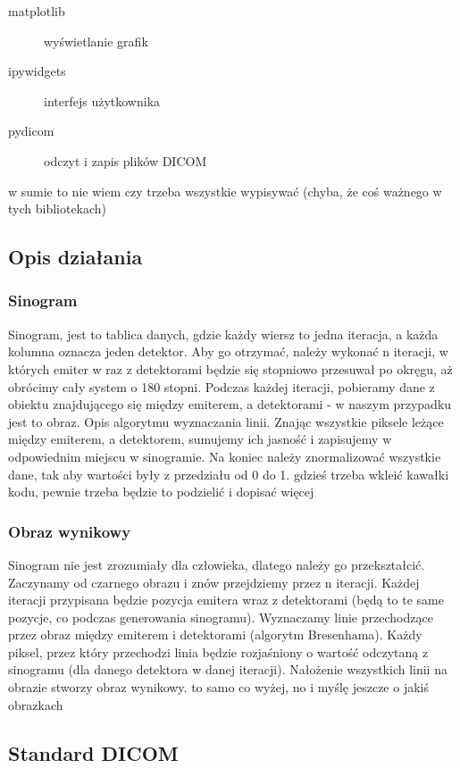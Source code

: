 \documentclass[polish,polish,a4paper]{article}
\begin{document}
			\begin{description}
				\item[matplotlib] wyświetlanie grafik
				\item[ipywidgets] interfejs użytkownika
				\item[pydicom] odczyt i zapis plików DICOM
			\end{description}
			{\color{red} w sumie to nie wiem czy trzeba wszystkie wypisywać (chyba, że coś ważnego w tych bibliotekach)}
	
			\subsection{Opis działania}
				\subsubsection{Sinogram}
				
				Sinogram, jest to tablica danych, 
				gdzie każdy wiersz to jedna iteracja, 
				a każda kolumna oznacza jeden detektor.
				Aby go otrzymać, należy wykonać n iteracji, 
				w których emiter w raz z detektorami będzie się stopniowo przesuwał po okręgu, 
				aż obrócimy cały system o 180 stopni. 
				Podczas każdej iteracji, 
				pobieramy dane z obiektu znajdującego się między emiterem, a detektorami
				 - w naszym przypadku jest to obraz. 
				 {\color{red} Opis algorytmu wyznaczania linii.}
				 Znając wszystkie piksele leżące między emiterem, a detektorem, 
				 sumujemy ich jasność i zapisujemy w odpowiednim miejscu w sinogramie.
				 Na koniec należy znormalizować wszystkie dane, tak aby wartości były z przedziału od 0 do 1.
				{\color{red} gdzieś trzeba wkleić kawałki kodu, pewnie trzeba będzie to podzielić i dopisać więcej}
				
				\subsubsection{Obraz wynikowy}
				Sinogram nie jest zrozumiały dla człowieka, 
				dlatego należy go przekształcić.
				Zaczynamy od czarnego obrazu i znów przejdziemy przez n iteracji.
				Każdej iteracji przypisana będzie pozycja emitera wraz z detektorami 
				(będą to te same pozycje, co podczas generowania sinogramu).
				Wyznaczamy linie przechodzące przez obraz między emiterem i detektorami (algorytm Bresenhama).
				Każdy piksel, przez który przechodzi linia będzie rozjaśniony o wartość odczytaną z sinogramu 
				(dla danego detektora w danej iteracji). 
				Nałożenie wszystkich linii na obrazie stworzy obraz wynikowy.
				{\color{red} to samo co wyżej, no i myślę jeszcze o jakiś obrazkach}
			\subsection{Standard DICOM}
\end{document}

